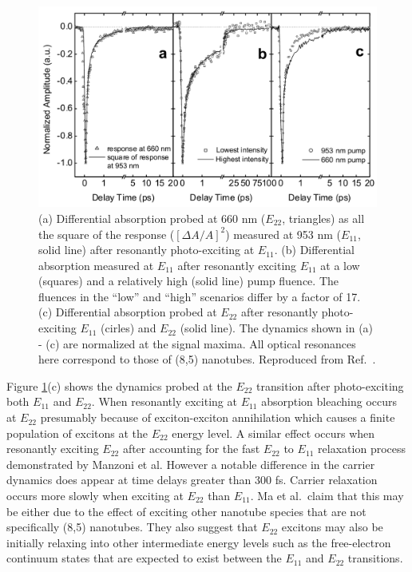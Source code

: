 \begin{figure}[ht]
	\centering
	\includegraphics[scale=0.35]{images/chapter_prior_works/abs_ma_2005}
	\caption{(a) Differential absorption probed at 660 nm ($E_{22}$, triangles) as all the square of the response ($[ \Delta A / A ]^2$) measured at 953 nm ($E_{11}$, solid line) after resonantly photo-exciting at $E_{11}$. (b) Differential absorption  measured at $E_{11}$ after resonantly exciting $E_{11}$ at a low (squares) and a relatively high (solid line) pump fluence. The fluences in the ``low'' and ``high'' scenarios differ by a factor of 17. (c) Differential absorption probed at $E_{22}$ after resonantly photo-exciting $E_{11}$ (cirles) and $E_{22}$ (solid line). The dynamics shown in (a) - (c) are normalized at the signal maxima. All optical resonances here correspond to those of (8,5) nanotubes. Reproduced from Ref.\ \cite{ma2005femtosecond}.}
	\label{fig:abs_ma_2005}
\end{figure}

 Figure \ref{fig:abs_ma_2005}(c) shows the dynamics probed at the $E_{22}$ transition after photo-exciting both $E_{11}$ and $E_{22}$. When resonantly exciting at $E_{11}$ absorption bleaching occurs at $E_{22}$ presumably because of exciton-exciton annihilation which causes a finite population of excitons at the $E_{22}$ energy level. A similar effect occurs when resonantly exciting $E_{22}$ after accounting for the fast $E_{22}$ to $E_{11}$ relaxation process demonstrated by Manzoni et al. However a notable difference in the carrier dynamics does appear at time delays greater than 300 fs. Carrier relaxation occurs more slowly when exciting at $E_{22}$ than $E_{11}$. Ma et al.\ claim that this may be either due to the effect of exciting other nanotube species that are not specifically (8,5) nanotubes. They also suggest that $E_{22}$ excitons may also be initially relaxing into other intermediate energy levels such as the free-electron continuum states that are expected to exist between the $E_{11}$ and $E_{22}$ transitions.

